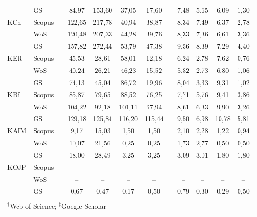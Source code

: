 \begin{table}
\begin{tabularx}{\textwidth}{XXp{0.2ex}ccccp{0.2ex}cccc}
         & GS     & & 84,97  & 153,60 & 37,05  & 17,60  & & 7,48  & 5,65 & 6,09  & 1,30 \\[1ex]
    KCh  & Scopus & & 122,65 & 217,78 & 40,94  & 38,87  & & 8,34  & 7,49 & 6,37  & 2,78 \\
         & WoS    & & 120,48 & 207,33 & 44,28  & 39,76  & & 8,33  & 7,36 & 6,61  & 3,36 \\
         & GS     & & 157,82 & 272,44 & 53,79  & 47,38  & & 9,56  & 8,39 & 7,29  & 4,40 \\[1ex]
    KER  & Scopus & & 45,53  & 28,61  & 58,01  & 12,18  & & 6,24  & 2,78 & 7,62  & 0,76 \\
         & WoS    & & 40,24  & 26,21  & 46,23  & 15,52  & & 5,82  & 2,73 & 6,80  & 1,06 \\
         & GS     & & 74,13  & 45,04  & 86,72  & 19,96  & & 8,04  & 3,33 & 9,31  & 1,02 \\[1ex]
    KBf  & Scopus & & 85,87  & 79,65  & 88,52  & 76,25  & & 7,71  & 5,76 & 9,41  & 3,86 \\
         & WoS    & & 104,22 & 92,18  & 101,11 & 67,94  & & 8,61  & 6,33 & 9,90  & 3,26 \\
         & GS     & & 129,18 & 125,84 & 116,20 & 115,44 & & 9,50  & 6,98 & 10,78 & 5,81 \\[1ex]
    KAIM & Scopus & & 9,17   & 15,03  & 1,50   & 1,50   & & 2,10  & 2,28 & 1,22  & 0,94 \\
         & WoS    & & 10,07  & 21,56  & 0,25   & 0,25   & & 1,73  & 2,77 & 0,50  & 0,50 \\
         & GS     & & 18,00  & 28,49  & 3,25   & 3,25   & & 3,09  & 3,01 & 1,80  & 1,80 \\[1ex]
    KOJP & Scopus & & --     & --     & --     & --     & & --    & --   & --    & --   \\
         & WoS    & & --     & --     & --     & --     & & --    & --   & --    & --   \\
         & GS     & & 0,67   & 0,47   & 0,17   & 0,50   & & 0,79  & 0,30 & 0,29  & 0,50 \\
    \bottomrule\noalign{\vspace{0.4ex}}
    \multicolumn{12}{l}{\footnotesize $^\ast$z~praktických dôvodov v~tabuľke uvádzame iba oficiálne skratky katedier, \emph{viď}~Tabuľka~\ref{tab:department.review}} \\
    \multicolumn{12}{l}{\footnotesize $^\dagger$Web of Science; $^\ddagger$Google Scholar} \\
  \end{tabularx}
\end{table}

